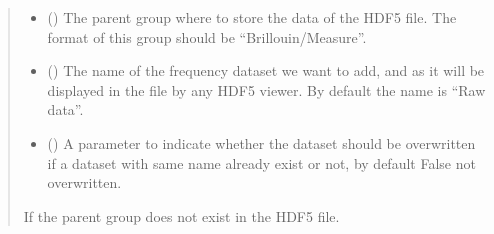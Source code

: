 \documentclass[letterpaper,10pt,english]{sphinxmanual}
\begin{document}
\begin{fulllineitems}
\begin{fulllineitems}
\begin{quote}
\begin{description}
\begin{itemize}
\item {} 
\sphinxAtStartPar
{} (\sphinxstyleliteralemphasis{\sphinxupquote{, }}) \textendash{} The parent group where to store the data of the HDF5 file. The format of this group should be “Brillouin/Measure”.

\item {} 
\sphinxAtStartPar
{} (\sphinxstyleliteralemphasis{\sphinxupquote{, }}) \textendash{} The name of the frequency dataset we want to add, and as it will be displayed in the file by any HDF5 viewer. By default the name is “Raw data”.

\item {} 
\sphinxAtStartPar
{} (\sphinxstyleliteralemphasis{\sphinxupquote{, }}) \textendash{} A parameter to indicate whether the dataset should be overwritten if a dataset with same name already exist or not, by default False \sphinxhyphen{} not overwritten.

\end{itemize}

\sphinxAtStartPar
{\hyperref[\detokenize{source/HDF5_BLS:HDF5_BLS.WrapperError.WrapperError_StructureError}]{}} \textendash{} If the parent group does not exist in the HDF5 file.

\end{description}\end{quote}

\end{fulllineitems}



\end{fulllineitems}
\end{document}
